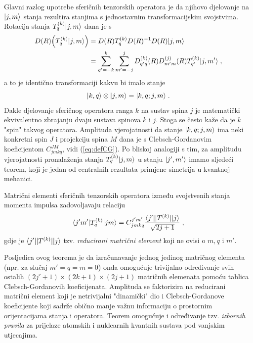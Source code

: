 Glavni razlog upotrebe sferičnih tenzorskih operatora je da njihovo
djelovanje na $| j,m \rangle$ stanja rezultira stanjima s jednostavnim
transformacijskim svojstvima. Rotacija stanja
$T^{(k)}_q| j,m \rangle$ dana je s
\begin{align}
    D(R) \Big( T^{(k)}_q| j,m \rangle \Big)& =
        D(R)  T^{(k)}_q D(R)^{-1} D(R) | j,m \rangle  \\
   &= \sum_{q'=-k}^{k} \sum_{m'=-j}^{j}
   D^{(k)}_{q'q}(R) D^{(j)}_{m'm}(R) T^{(k)}_{q'} | j, m' \rangle \;,
\end{align}
a to je identično transformaciji kakvu bi imalo stanje
\begin{equation}
    | k, q \rangle \otimes | j, m \rangle = | k, q; j, m \rangle \;.
\end{equation}
Dakle djelovanje sferičnog operatora ranga $k$ na sustav spina $j$ 
je matematički ekvivalentno zbrajanju dvaju sustava spinova $k$ i $j$.
Stoga se često kaže da je $k$ "spin" takvog operatora.
Amplituda vjerojatnosti da stanje $| k, q; j, m \rangle$ ima
neki konkretni spin $J$ i projekciju spina $M$ dana je s Clebsch-Gordanovim
koeficijentom $C^{J M}_{jmkq}$, vidi (\ref{eq:defCG}).
Po bliskoj analogiji s tim, za amplitudu vjerojatnosti
pronalaženja stanja $T^{(k)}_q| j,m \rangle$ u stanju $| j',m' \rangle$
imamo sljedeći teorem, koji je jedan od centralnih
rezultata primjene simetrija u kvantnoj mehanici.
\begin{teorem}
     
Matrični elementi sferičnih tenzorskih operatora između svojstvenih stanja momenta
impulsa zadovoljavaju relaciju
\begin{equation}
 \langle j'm' |T^{(k)}_q | jm \rangle = C^{j'm'}_{jmkq}
\frac{\langle j' ||T^{(k)}|| j \rangle}{\sqrt{2j+1}} \;,
\end{equation}
gdje je $\langle j' ||T^{(k)}|| j \rangle$ tzv. \emph{reducirani matrični element}
koji ne ovisi o $m, q$ i $m'$.
\end{teorem}
Posljedica ovog teorema je da izračunavanje jednog jedinog matričnog elementa
(npr. za slučaj $m'=q=m=0$) onda omogućuje trivijalno određivanje svih ostalih
$(2j'+1)\times(2k+1)\times(2j+1)$ matričnih elemenata
pomoću tablica Clebsch-Gordanovih koeficijenata.
Amplituda se faktorizira na reducirani matrični element koji je netrivijalni 
"dinamički" dio i Clebsch-Gordanove koeficijente koji sadrže obično
manje važnu informaciju o prostornim orijentacijama stanja i operatora.
Teorem omogućuje i određivanje tzv. \emph{izbornih pravila} za prijelaze
atomskih i nuklearnih kvantnih sustava pod vanjskim utjecajima.

